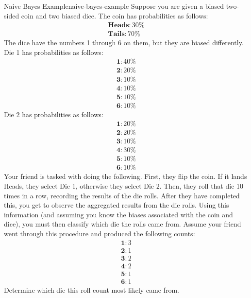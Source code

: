 \begin{example}{Naive Bayes Example}{naive-bayes-example}
	Suppose you are given a biased two-sided coin and two biased dice. The coin has probabilities as follows:
	\begin{align*}
		\textbf{Heads}: 30\% \\
		\textbf{Tails}: 70\%
	\end{align*}
	The dice have the numbers 1 through 6 on them, but they are biased differently. Die 1 has probabilities as follows:
	\begin{align*}
		\textbf{1}: 40\% \\
		\textbf{2}: 20\% \\
		\textbf{3}: 10\% \\
		\textbf{4}: 10\% \\
		\textbf{5}: 10\% \\
		\textbf{6}: 10\%
	\end{align*}
	Die 2 has probabilities as follows:
	\begin{align*}
		\textbf{1}: 20\% \\
		\textbf{2}: 20\% \\
		\textbf{3}: 10\% \\
		\textbf{4}: 30\% \\
		\textbf{5}: 10\% \\
		\textbf{6}: 10\%
	\end{align*}
	Your friend is tasked with doing the following. First, they flip the coin. If it lands Heads, they select Die 1, otherwise they select Die 2. Then, they roll that die 10 times in a row, recording the results of the die rolls. After they have completed this, you get to observe the aggregated results from the die rolls. Using this information (and assuming you know the biases associated with the coin and dice), you must then classify which die the rolls came from. Assume your friend went through this procedure and produced the following counts:
	\begin{align*}
		\textbf{1}: 3 \\
		\textbf{2}: 1 \\
		\textbf{3}: 2 \\
		\textbf{4}: 2 \\
		\textbf{5}: 1 \\
		\textbf{6}: 1
	\end{align*}
	Determine which die this roll count most likely came from. \newline \newline


\end{example}

